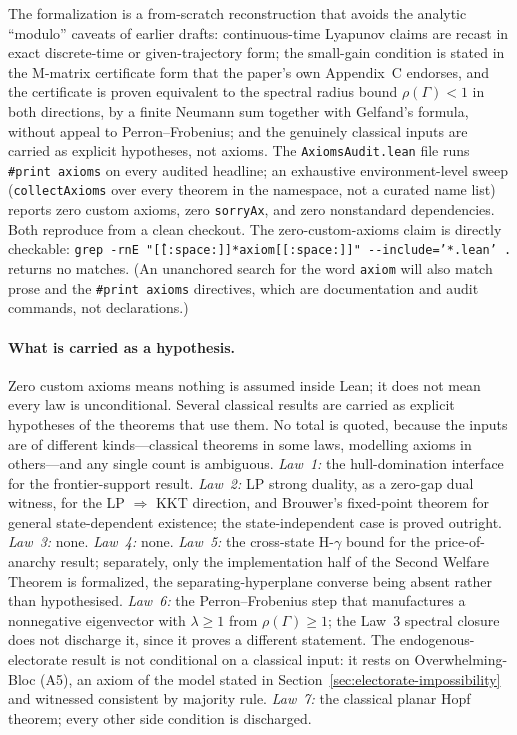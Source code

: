 \documentclass[12pt]{article}
\begin{document}
The formalization is a from-scratch reconstruction that avoids the analytic ``modulo'' caveats of earlier drafts: continuous-time Lyapunov claims are recast in exact discrete-time or given-trajectory form; the small-gain condition is stated in the M-matrix certificate form that the paper's own Appendix~C endorses, and the certificate is proven equivalent to the spectral radius bound $\rho(\Gamma) < 1$ in both directions, by a finite Neumann sum together with Gelfand's formula, without appeal to Perron--Frobenius; and the genuinely classical inputs are carried as explicit hypotheses, not axioms. The \texttt{AxiomsAudit.lean} file runs \texttt{\#print axioms} on every audited headline; an exhaustive environment-level sweep (\texttt{collectAxioms} over every theorem in the namespace, not a curated name list) reports zero custom axioms, zero \texttt{sorryAx}, and zero nonstandard dependencies. Both reproduce from a clean checkout. The zero-custom-axioms claim is directly checkable: \texttt{grep -rnE "\^[[:space:]]*axiom[[:space:]]" -{}-include='*.lean' .} returns no matches. (An unanchored search for the word \texttt{axiom} will also match prose and the \texttt{\#print axioms} directives, which are documentation and audit commands, not declarations.)

\paragraph{What is carried as a hypothesis.} Zero custom axioms means nothing is assumed inside Lean; it does not mean every law is unconditional. Several classical results are carried as explicit hypotheses of the theorems that use them. No total is quoted, because the inputs are of different kinds---classical theorems in some laws, modelling axioms in others---and any single count is ambiguous. \emph{Law~1:} the hull-domination interface for the frontier-support result. \emph{Law~2:} LP strong duality, as a zero-gap dual witness, for the LP $\Rightarrow$ KKT direction, and Brouwer's fixed-point theorem for general state-dependent existence; the state-independent case is proved outright. \emph{Law~3:} none. \emph{Law~4:} none. \emph{Law~5:} the cross-state H-$\gamma$ bound for the price-of-anarchy result; separately, only the implementation half of the Second Welfare Theorem is formalized, the separating-hyperplane converse being absent rather than hypothesised. \emph{Law~6:} the Perron--Frobenius step that manufactures a nonnegative eigenvector with $\lambda \geq 1$ from $\rho(\Gamma) \geq 1$; the Law~3 spectral closure does not discharge it, since it proves a different statement. The endogenous-electorate result is not conditional on a classical input: it rests on Overwhelming-Bloc (A5), an axiom of the model stated in Section~\ref{sec:electorate-impossibility} and witnessed consistent by majority rule. \emph{Law~7:} the classical planar Hopf theorem; every other side condition is discharged.
\end{document}
